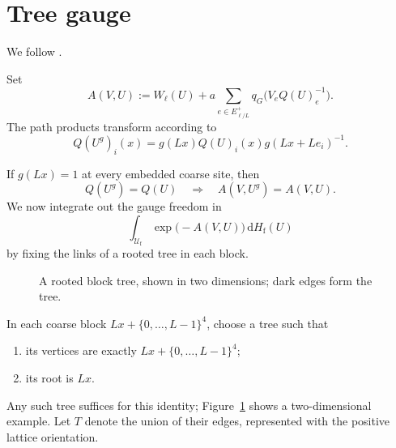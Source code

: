 \documentclass[10pt,reqno]{amsart}
\theoremstyle{definition}
\theoremstyle{remark}
\numberwithin{equation}{section}
\numberwithin{figure}{section}
\newcommand{\dd}{\mathrm d}
\newcommand{\Uf}{\mathcal U_{\mathrm f}}
\newcommand{\Hf}{H_{\mathrm f}}
\begin{document}
\section{Tree gauge}
We follow \cite[Section~11, Lemma~11.2]{Exposition}.

Set
\begin{equation}\label{eq:blocking-action}
A(V,U):=W_\ell(U)+a\sum_{e\in E_{\ell/L}^+}q_G\bigl(V_eQ(U)_e^{-1}\bigr).
\end{equation}
The path products transform according to
\begin{equation}\label{eq:display-062}
Q(U^g)_i(x)=g(Lx)Q(U)_i(x)g(Lx+Le_i)^{-1}.
\end{equation}

If $g(Lx)=1$ at every embedded coarse site, then
\begin{equation}\label{eq:display-063}
Q(U^g)=Q(U)
\quad\Longrightarrow\quad
A(V,U^g)=A(V,U).
\end{equation}
We now integrate out the gauge freedom in
\begin{equation}\label{eq:display-064}
\int_{\Uf}\exp\bigl(-A(V,U)\bigr)\,\dd\Hf(U)
\end{equation}
by fixing the links of a rooted tree in each block.

\begin{figure}[htbp]
\centering
{}
\caption{A rooted block tree, shown in two dimensions; dark edges form the tree.}
\label{fig:block-tree}
\end{figure}

In each coarse block $Lx+\{0,\ldots,L-1\}^4$, choose a tree such that
\begin{enumerate}[label=(\roman*)]
\item its vertices are exactly $Lx+\{0,\ldots,L-1\}^4$;
\item its root is $Lx$.
\end{enumerate}
Any such tree suffices for this identity; Figure~\ref{fig:block-tree} shows a two-dimensional example.
Let $T$ denote the union of their edges, represented with the positive lattice orientation.
\end{document}
